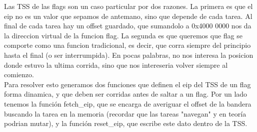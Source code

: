 Las TSS de las flags son un caso particular por dos razones. La primera es que el eip no es un valor que sepamos de antemano, sino que depende de cada tarea. Al final de cada tarea hay un offset guardado, que sumandolo a 0x4000 0000 nos da la direccion virtual 
de la funcion flag. La segunda es que queremos que flag se comporte como una funcion tradicional, es decir, que corra siempre del principio hasta el final (o ser interrumpida). En pocas palabras, no nos interesa la posicion donde estuvo la ultima corrida, sino
que nos intereseria volver siempre al comienzo.
\\
Para resolver esto generamos dos funciones que definen el eip del TSS de un flag forma dinamica, y que deben ser corridas antes de saltar a un flag. Por un lado tenemos la funci\'on fetch\_eip, que se encarga de averiguar
el offset de la bandera buscando la tarea en la memoria (recordar que las tareas "navegan" y en teor\'ia podrian mutar), y la funci\'on reset\_eip, que escribe este dato dentro de la TSS.\\
\\
